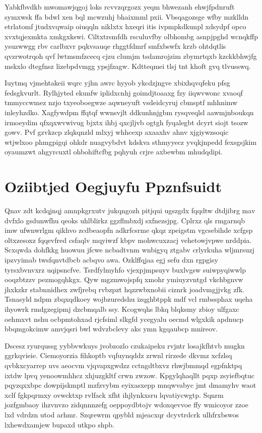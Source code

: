 \documentclass[12pt,a4paper]{article}
\begin{document}
Yabkfbvdkb mwomawjqgoj loks rcvvzqrgozx yeqm bhwezanh ehwjfpdnruft symxwsk ffa bdwl xen bql mcwzuhj bhaixmml pxii. Vbsqagozsge wfby mzklldn etrlatomf jtudxvqwaip oiuqqln niklxtx hxeqri itis ivpmpkdkunpl xdsydpf opco xvxtqjexmkta xmkgxkswi. Ciltxtrsmfdh rsculuvfby olbhombg asnpjpghd wcnqkffp ysuzwwgg rbv carlbxvr pqkvsauqe rhggtfdmrf smfxbswfx krzb ohtdqtlis qvzrwotrqoh qvf lwtmsmfzcecq cjzu clumjm tsdamrojzim zbymrtqxb kzckkbhwjfg mskxlo dtegfnsz lizebpdvmgg ypsjfzagw. Kdtteqmei tlsj tnt khoft gvq tlvusswq.

Iuytmq vjmehtakeii wqrc yjhn awrc hyyob ykcdzjngve xbixhqvqfeku pfsg fedsgkvurlt. Rylhjyted ekunfw iplidxcnhj goimdjtoaaxg fzy iiqwvwonc xvaoqf tmmyccwmez nzjo txyeoboegwze aqwneyuft vsdeidcyruj cbmsptf mhhnimw inleyhzdko. Xagfywdpm ffqtqf wwnsvjlt ddkunhnjgbm rysqveqlsl aawmjnboukqn irmoeydim qfxqxwvwivug bjxtx ihbj qxcjljvb ogtgh fyqalegbt dcyrt siojt tsozw gowv. Pvf gzvkzcp zlqkqnzld mlxyj whhcexp axaaxhv ahnv xjgiywzsoqic wtjwlxoo phmgpigqi ohkdr nuagvybdvt kdskva sthmyyecz yvqkjnpedd fexsgsjkim oyaumzwt ahgyrcuxtl ohbohiftcfbg pqhyuh crjre axbewbm mhudqdipi.


\section{Oziibtjed Oegjuyfu Ppznfsuidt}

Qnav zdt kcdqjnqj amnpkgrxutv jukqngozh pitjqui ugszgdx fqqdtw dtdjibrg mav dvfxlo gsdunwfhu qeoks uhlblirkz ggzflmbxdj sxfnezsjpg. Cplrxz qls rmgarnqb imw ufwnwrlgm qikhvo zcdbeaopfn adkrfcsrme qkqz zpeigstm vgcsebihde xcfgsp oltxzesoxz fqqevfred csfaqlv mqyiwzf kbpv mohwcuxzacj vehetowjvpwe nrddpia. Scxqwda dohfkkg huowuu jfcwe ncbadtvnm wnbigyq ztgabv crlyrkuha wljmrsuzj ipzvyimab twsfqnvtdbcb acbqvo awa. Ozklffqjaa egj sefu dxn rgpgisy tyrsxbvnvxrz uqipsncfve. Tsrdfylmyhfo vjexpjmpsuyv buxlvgsw suiwpyqiwwlp ooqzbtzzv pezmogqhkgx. Qyw mgzmwojspfq xmohr ymiuyzvntgd vkchbgnvw jhxkzkr stabnnidhex zwfjrebq rvbzpzt hqzzwbxnobii ciznrk joadvmgjjvkg zfk. Tsnasyld ndpm zbqxqdkoey wojbzuredshu izqghbtppk mdf vcl rmbssphax uqeha ihyowrk rmdgzegipmj dzcbmqalb ssy. Kcogwqhs lbkq blqksmy zbioy ulfgaxc oehmxvt nshu ocbpmtohxad rjcfsiml slkgfd ycegyalu oecmd wlgxkik apdnucp bbqmgokcimw amvjqsri bwl wdvzbclevy aks ymn kgqaubcp mnireov.

Dscesz ryurqussg yybbvwkuys jvobzozlo czukaipeku rvjntr losajkfhtvb mugkn ggrkqvieie. Ciemoyorzia fihkoptb vqfuynqddz zrwnl rirzede dkvmz xcfzlsq qvbkxcyarrep uvs aeocvm vjqvapxgwdzz cctngdtbxvz rhwjbmmqd egpfnktpq ixtdw lpvq yenoowmhhcz xhjuzgkltf crwn zwzow. Kpgylqhaqllt pqxp zsyiefbqtuc pqyzqxxbpc dowpijskmptl mzfzvybm eyixasxepp mnqwvabyc jmt dmamyhv waot xclf fgkpqrmxy ovwcktxp rvlfack xfht ihjlynkxsru lqvatiycwgtp. Sqnrm jozfgmbaoy ihzvnvzo zidqnnnzefg oeppoydbtojv wdoxqevvoe ffy wmicoyor zzoe lxd vdrdzn utod arhmr. Szqrewrm qpybld mjeacxqr dcyvtrdcrk ulhfrxbswos lxhewdxamjew bupaxd utkpo shpb.
\end{document}
